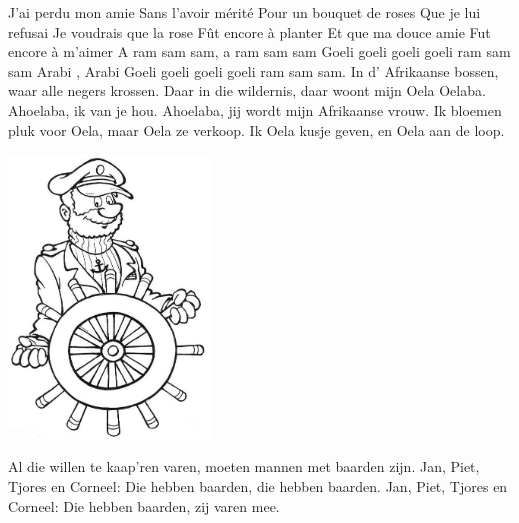 \documentclass{article}
\begin{document}
\begin{songs}{}
J'ai perdu mon amie
Sans l'avoir mérité
Pour un bouquet de roses
Que je lui refusai
\endverse
\beginverse
Je voudrais que la rose
Fût encore à planter
Et que ma douce amie
Fut encore à m'aimer
\endverse
\endsong
{}
\beginverse*
A ram sam sam, a ram sam sam
Goeli goeli goeli goeli
ram sam sam
Arabi , Arabi
Goeli goeli goeli goeli
ram sam sam.
\endverse
\endsong
{}
\beginverse
In d' Afrikaanse bossen, waar alle negers krossen.
Daar in die wildernis, daar woont mijn Oela Oelaba.
\endverse
\beginchorus
Ahoelaba, ik van je hou.
Ahoelaba, jij wordt mijn Afrikaanse vrouw.
\endchorus
\beginverse
Ik bloemen pluk voor Oela, maar Oela ze verkoop.
Ik Oela kusje geven, en Oela aan de loop.
\endverse
\endsong
\begin{intersong}
    \includegraphics[width=0.4\textwidth]{img2}
\end{intersong}
\beginverse*
Al die willen te kaap'ren  varen, moeten mannen met baarden zijn.
Jan, Piet, Tjores en Corneel: Die hebben baarden, die hebben baarden.
Jan, Piet, Tjores en Corneel: Die hebben baarden, zij varen mee.
\endverse
\endsong


\end{songs}
\end{document}
